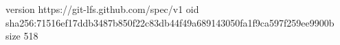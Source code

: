 version https://git-lfs.github.com/spec/v1
oid sha256:71516ef17ddb3487b850f22c83db44f49a689143050fa1f9ca597f259ee9900b
size 518
